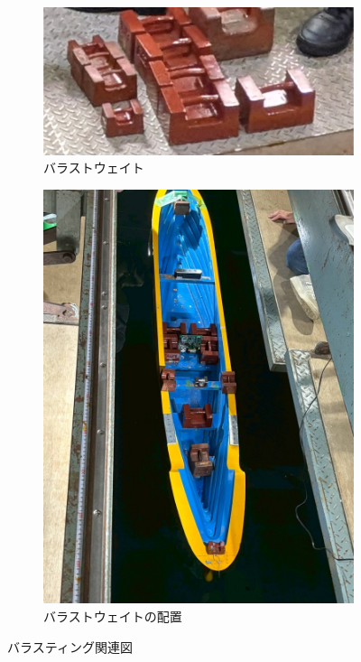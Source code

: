 \documentclass[dvipdfmx,a4paper]{jreport} %
\begin{document}
 \begin{figure}[H] %
     \centering
     \begin{subfigure}[b]{0.45\textwidth}
         \includegraphics[width=\textwidth]{summer/ship-experiment/long-pool/ballast_weight.png} %
         \caption{バラストウェイト}
         \label{fig:ballast_weight}
     \end{subfigure}
     \hfill
     \begin{subfigure}[b]{0.45\textwidth}
         \includegraphics[width=\textwidth]{summer/ship-experiment/long-pool/ballast_arrangement.png} %
         \caption{バラストウェイトの配置}
         \label{fig:ballast_arrangement}
     \end{subfigure}
     \caption{バラスティング関連図}
 \end{figure}
\end{document}
